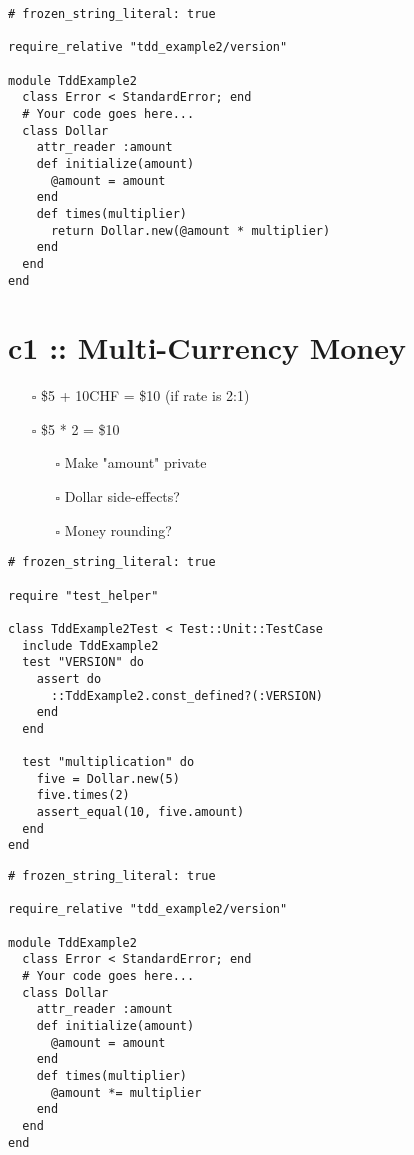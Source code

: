 \documentclass[11pt]{article}
\begin{document}
\begin{verbatim}
# frozen_string_literal: true

require_relative "tdd_example2/version"

module TddExample2
  class Error < StandardError; end
  # Your code goes here...
  class Dollar
    attr_reader :amount
    def initialize(amount)
      @amount = amount
    end
    def times(multiplier)
      return Dollar.new(@amount * multiplier)
    end
  end
end
\end{verbatim}


\section{c1 :: Multi-Currency Money}
\label{sec:orgc276672}
\begin{itemize}
\item[{$\square$}] \$5 + 10CHF = \$10 (if rate is 2:1)
\item[{$\square$}] \$5 * 2 = \$10
\begin{itemize}
\item[{$\square$}] Make "amount" private
\item[{$\square$}] Dollar side-effects?
\item[{$\square$}] Money rounding?
\end{itemize}
\end{itemize}
\begin{verbatim}
# frozen_string_literal: true

require "test_helper"

class TddExample2Test < Test::Unit::TestCase
  include TddExample2
  test "VERSION" do
    assert do
      ::TddExample2.const_defined?(:VERSION)
    end
  end

  test "multiplication" do
    five = Dollar.new(5)
    five.times(2)
    assert_equal(10, five.amount)
  end
end
\end{verbatim}

\begin{verbatim}
# frozen_string_literal: true

require_relative "tdd_example2/version"

module TddExample2
  class Error < StandardError; end
  # Your code goes here...
  class Dollar
    attr_reader :amount
    def initialize(amount)
      @amount = amount
    end
    def times(multiplier)
      @amount *= multiplier
    end
  end
end
\end{verbatim}
\end{document}
